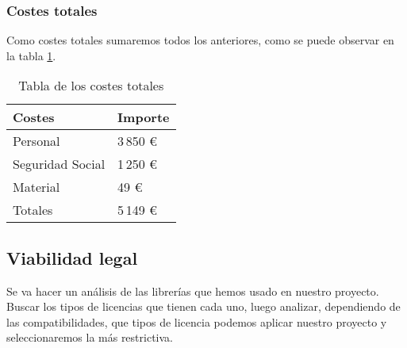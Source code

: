 \subsubsection{Costes totales}
Como costes totales sumaremos todos los anteriores, como se puede observar en la tabla \ref{tab:costes}.

\begin{table}[]
\centering
\caption{Tabla de los costes totales}
\label{tab:costes}
\begin{tabular}{p{4cm} p{2cm}}
\toprule
Costes & Importe \\ \midrule
Personal         & 3\,850 \euro{}   \\ 
Seguridad Social & 1\,250 \euro{} \\ 
Material         & 49 \euro{}   \\ 
Totales             & 5\,149 \euro{} \\ \bottomrule
\end{tabular}
\end{table}

\subsection{Viabilidad legal}
Se va hacer un análisis de las librerías que hemos usado en nuestro proyecto. Buscar los tipos de licencias que tienen cada uno, luego analizar, dependiendo de las compatibilidades, que tipos de licencia podemos aplicar nuestro proyecto y seleccionaremos la más restrictiva.

